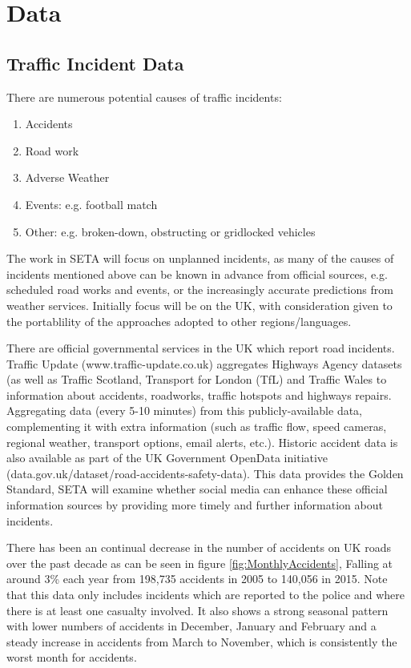 \documentclass{article}
\begin{document}
\section{Data}

\subsection{Traffic Incident Data}

There are numerous potential causes of traffic incidents:
\begin{enumerate}
	\item Accidents
	\item Road work
	\item Adverse Weather
	\item Events: e.g. football match
	\item Other: e.g. broken-down, obstructing or gridlocked vehicles
\end{enumerate}

The work in SETA will focus on unplanned incidents, as many of the causes of incidents mentioned above can be known in advance from official sources, e.g. scheduled road works and events, or the increasingly accurate predictions from weather services. Initially focus will be on the UK, with consideration given to the portablility of the approaches adopted to other regions/languages. 

There are official governmental services in the UK which report road incidents. Traffic Update (www.traffic-update.co.uk) aggregates Highways Agency datasets (as well as Traffic Scotland, Transport for London (TfL) and Traffic Wales to information about accidents, roadworks, traffic hotspots and highways repairs. Aggregating data (every 5-10 minutes) from this publicly-available data, complementing it with extra information (such as traffic flow, speed cameras, regional weather, transport options, email alerts, etc.). Historic accident data is also available as part of the UK Government OpenData initiative (data.gov.uk/dataset/road-accidents-safety-data). This data provides the Golden Standard, SETA will examine whether social media can enhance these official information sources by providing more timely and further information about incidents.

There has been an continual decrease in the number of accidents on UK roads over the past decade as can be seen in figure \ref{fig:MonthlyAccidents}, Falling at around 3\% each year from 198,735 accidents in 2005 to 140,056 in 2015. Note that this data only includes incidents which are reported to the police and where there is at least one casualty involved. It also shows a strong seasonal pattern with lower numbers of accidents in December, January and February and a steady increase in accidents from March to November, which is consistently the worst month for accidents.
\end{document}
